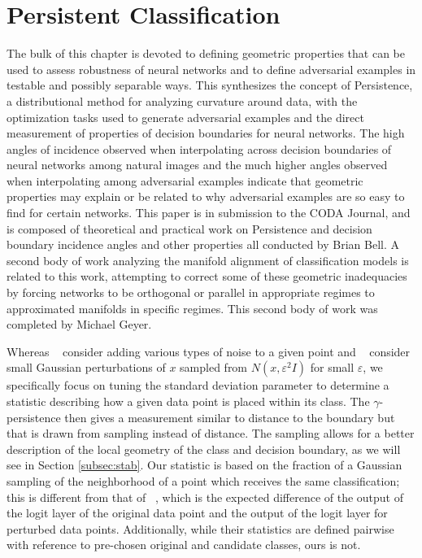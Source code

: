 \chapter{Persistent Classification}
\label{Chapter3}

The bulk of this chapter is devoted to defining geometric properties
that can be used to assess robustness of neural networks and to
define adversarial examples in testable and possibly separable
ways. This synthesizes the concept of Persistence, a distributional
method for analyzing curvature around data, with the optimization
tasks used to generate adversarial examples and the direct measurement
of properties of decision boundaries for neural networks. The high
angles of incidence observed when interpolating across decision
boundaries of neural networks among natural images and the much higher
angles observed when interpolating among adversarial examples indicate
that geometric properties may explain or be related to why adversarial
examples are so easy to find for certain networks. This paper is in
submission to the CODA Journal, and is composed of theoretical and
practical work on Persistence and decision boundary incidence angles
and other properties all conducted by Brian Bell. A second body of
work analyzing the manifold alignment of classification models is
related to this work, attempting to correct some of these geometric
inadequacies by forcing networks to be orthogonal or parallel in
appropriate regimes to approximated manifolds in specific
regimes. This second body of work was completed by Michael Geyer.

Whereas ~\citet{roth19aodds} consider adding various types of noise to a given point and ~\citet{hosseini2019odds} consider small Gaussian perturbations of $x$ sampled from $N(x,\varepsilon^2 I)$ for small $\varepsilon$, %
we specifically focus on %
tuning the standard deviation parameter to determine a statistic describing how a given data point is placed within its class. The $\gamma$-persistence then gives a measurement similar to distance to the boundary but that is drawn from sampling instead of distance. The sampling allows for a better description of the local geometry of the class and decision boundary, as we will see in Section \ref{subsec:stab}. Our statistic is based on the fraction of a Gaussian sampling of the neighborhood of a point which receives the same classification; this is different from that of ~\citet{roth19aodds}, which is the expected difference of the output of the logit layer of the original data point and the output of the logit layer for perturbed data points.  Additionally, while their statistics are defined pairwise with reference to pre-chosen original and candidate classes, ours is not.

